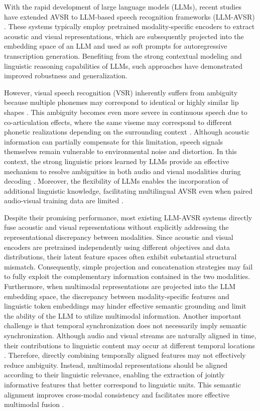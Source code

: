 \documentclass[conference]{IEEEtran}
\begin{document}
With the rapid development of large language models (LLMs), recent studies have extended AVSR to LLM-based speech recognition frameworks (LLM-AVSR) \cite{WFlamingo2024, CappellazzoICASSP2025, CappellazzoOmni2025, MMSLLAMA2025}. These systems typically employ pretrained modality-specific encoders to extract acoustic and visual representations, which are subsequently projected into the embedding space of an LLM and used as soft prompts for autoregressive transcription generation. Benefiting from the strong contextual modeling and linguistic reasoning capabilities of LLMs, such approaches have demonstrated improved robustness and generalization.

However, visual speech recognition (VSR) inherently suffers from ambiguity because multiple phonemes may correspond to identical or highly similar lip shapes \cite{VALLR2025, VSPLLM2024}. This ambiguity becomes even more severe in continuous speech due to co-articulation effects, where the same viseme may correspond to different phonetic realizations depending on the surrounding context \cite{VALLR2025, VSPLLM2024}. Although acoustic information can partially compensate for this limitation, speech signals themselves remain vulnerable to environmental noise and distortion. In this context, the strong linguistic priors learned by LLMs provide an effective mechanism to resolve ambiguities in both audio and visual modalities during decoding \cite{WFlamingo2024, MMSLLAMA2025, CappellazzoICASSP2025}. Moreover, the flexibility of LLMs enables the incorporation of additional linguistic knowledge, facilitating multilingual AVSR even when paired audio-visual training data are limited \cite{ZeroAVSR2025}.

Despite their promising performance, most existing LLM-AVSR systems directly fuse acoustic and visual representations without explicitly addressing the representational discrepancy between modalities. Since acoustic and visual encoders are pretrained independently using different objectives and data distributions, their latent feature spaces often exhibit substantial structural mismatch. Consequently, simple projection and concatenation strategies may fail to fully exploit the complementary information contained in the two modalities. Furthermore, when multimodal representations are projected into the LLM embedding space, the discrepancy between modality-specific features and linguistic token embeddings may hinder effective semantic grounding and limit the ability of the LLM to utilize multimodal information. Another important challenge is that temporal synchronization does not necessarily imply semantic synchronization. Although audio and visual streams are naturally aligned in time, their contributions to linguistic content may occur at different temporal locations \cite{Unsynchronized2025}. Therefore, directly combining temporally aligned features may not effectively reduce ambiguity. Instead, multimodal representations should be aligned according to their linguistic relevance, enabling the extraction of jointly informative features that better correspond to linguistic units. This semantic alignment improves cross-modal consistency and facilitates more effective multimodal fusion \cite{AlignFuse2021}.
\end{document}
